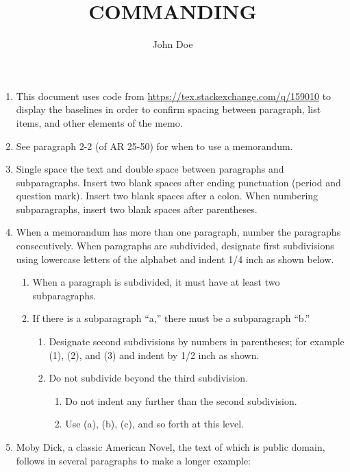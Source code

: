 \documentclass{../armymemo}
\author{John Doe}\rank{CPT}\branch{CY}
\title{COMMANDING}
\begin{document}
\begin{enumerate}
\item This document uses code from \url{https://tex.stackexchange.com/q/159010}
  to display the baselines in order to confirm spacing between paragraph, list
  items, and other elements of the memo.
\item See paragraph 2-2 (of AR 25-50) for when to use a memorandum.
\item Single space the text and double space between paragraphs and subparagraphs. Insert two blank spaces after ending punctuation (period and question mark). Insert two blank spaces after a colon. When numbering subparagraphs, insert two blank spaces after parentheses.
\item When a memorandum has more than one paragraph, number the paragraphs consecutively. When paragraphs are subdivided, designate first subdivisions using lowercase letters of the alphabet and indent 1/4 inch as shown below.
  \begin{enumerate}
  \item When a paragraph is subdivided, it must have at least two subparagraphs.
  \item If there is a subparagraph ``a,'' there must be a subparagraph ``b.''
    \begin{enumerate}
    \item Designate second subdivisions by numbers in parentheses; for example (1), (2), and (3) and indent by 1/2 inch as shown.
    \item Do not subdivide beyond the third subdivision.
      \begin{enumerate}
      \item Do not indent any further than the second subdivision.
      \item Use (a), (b), (c), and so forth at this level.
      \end{enumerate}
    \end{enumerate}
  \end{enumerate}
\item Moby Dick, a classic American Novel, the text of which is public domain,
  follows in several paragraphs to make a longer example:


\end{enumerate}
\end{document}
